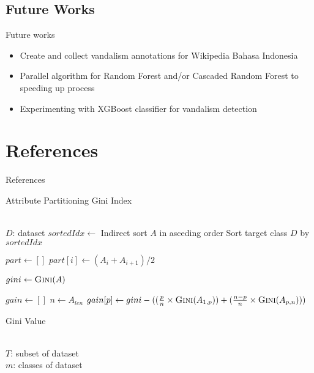 \documentclass[english]{beamer}
\begin{document}
\subsection{Future Works}
\begin{frame}
	{Future works}
	\begin{itemize}
		\item Create and collect vandalism annotations for Wikipedia Bahasa
		Indonesia
		\item Parallel algorithm for Random Forest and/or Cascaded Random
		Forest to speeding up process
		\item Experimenting with XGBoost classifier for vandalism detection
	\end{itemize}
\end{frame}

\section*{References}

\begin{frame}{References}
\printbibliography
\end{frame}

\begin{frame}
	{Attribute Partitioning}
	{Gini Index}
	\small
	\begin{algorithmic}[1]
		\Require \\
		$ D $: dataset
				\State $ sortedIdx \gets $ Indirect sort $A$ in asceding
				order
				\State Sort target class $D$ by $ sortedIdx $

				\State $ part \gets [ ] $
					\State $ part[i] \gets (A_{i} + A_{i+1}) / 2 $
				\EndFor

				\State $ gini \gets \Call{Gini}{A} $

				\State $ gain \gets [ ] $
				\State $ n \gets A_{len} $
					\State $ gain[p] \gets gini - (
						(\frac{p}{n} \times \Call{Gini}{A_{1,p}})
						+
						(\frac{n - p}{n} \times \Call{Gini}{A_{p,n}})
						)
						$
				\EndFor
			\EndFor
		\EndFunction
	\end{algorithmic}
\end{frame}

\begin{frame}
	{Gini Value}
	\begin{algorithmic}[1]
		\Require \\
		$ T $: subset of dataset \\
		$ m $: classes of dataset
			\State {}
		\EndFunction
	\end{algorithmic}
\end{frame}
\end{document}
